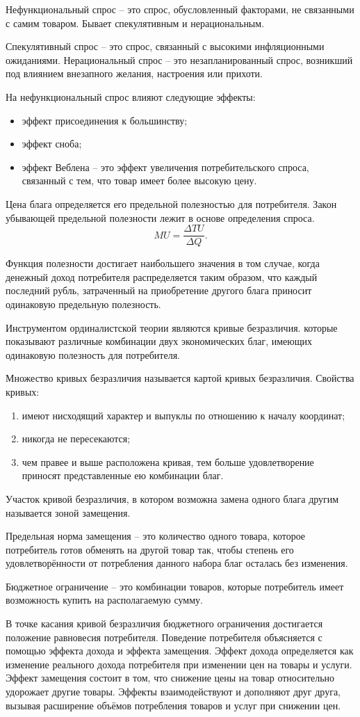 Нефункциональный спрос -- это спрос, обусловленный факторами, не связанными с
самим товаром. Бывает спекулятивным и нерациональным.

Спекулятивный спрос -- это спрос, связанный с высокими инфляционными ожиданиями.
Нерациональный спрос -- это незапланированный спрос, возникший под влиянием
внезапного желания, настроения или прихоти.

На нефункциональный спрос влияют следующие эффекты:
\begin{itemize}
    \item эффект присоединения к большинству;
    \item эффект сноба;
    \item эффект Веблена -- это эффект увеличения потребительского спроса,
        связанный с тем, что товар имеет более высокую цену.
\end{itemize}

Цена блага определяется его предельной полезностью для потребителя. Закон
убывающей предельной полезности лежит в основе определения спроса.
\[
    MU = \frac{\Delta TU}{\Delta Q}.
\]

Функция полезности достигает наибольшего значения в том случае, когда денежный
доход потребителя распределяется таким образом, что каждый последний рубль,
затраченный на приобретение другого блага приносит одинаковую предельную
полезность.

Инструментом ординалистской теории являются кривые безразличия. которые
показывают различные комбинации двух экономических благ, имеющих одинаковую
полезность для потребителя.

Множество кривых безразличия называется картой кривых безразличия.
Свойства кривых:
\begin{enumerate}
    \item имеют нисходящий характер и выпуклы по отношению к началу координат;
    \item никогда не пересекаются;
    \item чем правее и выше расположена кривая, тем больше удовлетворение
        приносят представленные ею комбинации благ.
\end{enumerate}
Участок кривой безразличия, в котором возможна замена одного блага другим
называется зоной замещения.

Предельная норма замещения -- это количество одного товара, которое потребитель
готов обменять на другой товар так, чтобы степень его удовлетворённости от
потребления данного набора благ осталась без изменения.

Бюджетное ограничение -- это комбинации товаров, которые потребитель имеет
возможность купить на располагаемую сумму.

В точке касания кривой безразличия бюджетного ограничения достигается положение
равновесия потребителя. Поведение потребителя объясняется с помощью эффекта
дохода и эффекта замещения. Эффект дохода определяется как изменение реального
дохода потребителя при изменении цен на товары и услуги. Эффект замещения
состоит в том, что снижение цены на товар относительно удорожает другие товары.
Эффекты взаимодействуют и дополняют друг друга, вызывая расширение объёмов
потребления товаров и услуг при снижении цен.
